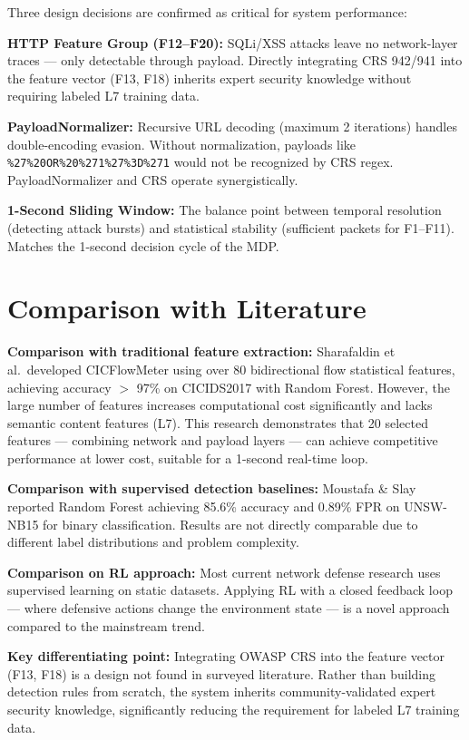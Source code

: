 \documentclass[12pt,a4paper]{report}
\begin{document}
Three design decisions are confirmed as critical for system performance:

\textbf{HTTP Feature Group (F12--F20):} SQLi/XSS attacks leave no network-layer traces --- only detectable through payload. Directly integrating CRS 942/941 into the feature vector (F13, F18) inherits expert security knowledge without requiring labeled L7 training data.

\textbf{PayloadNormalizer:} Recursive URL decoding (maximum 2 iterations) handles double-encoding evasion. Without normalization, payloads like \texttt{\%27\%20OR\%20\%271\%27\%3D\%271} would not be recognized by CRS regex. PayloadNormalizer and CRS operate synergistically.

\textbf{1-Second Sliding Window:} The balance point between temporal resolution (detecting attack bursts) and statistical stability (sufficient packets for F1--F11). Matches the 1-second decision cycle of the MDP.

\section{Comparison with Literature}

\textbf{Comparison with traditional feature extraction:} Sharafaldin et al.\ developed CICFlowMeter using over 80 bidirectional flow statistical features, achieving accuracy $>$ 97\% on CICIDS2017 with Random Forest. However, the large number of features increases computational cost significantly and lacks semantic content features (L7). This research demonstrates that 20 selected features --- combining network and payload layers --- can achieve competitive performance at lower cost, suitable for a 1-second real-time loop.

\textbf{Comparison with supervised detection baselines:} Moustafa \& Slay reported Random Forest achieving 85.6\% accuracy and 0.89\% FPR on UNSW-NB15 for binary classification. Results are not directly comparable due to different label distributions and problem complexity.

\textbf{Comparison on RL approach:} Most current network defense research uses supervised learning on static datasets. Applying RL with a closed feedback loop --- where defensive actions change the environment state --- is a novel approach compared to the mainstream trend.

\textbf{Key differentiating point:} Integrating OWASP CRS into the feature vector (F13, F18) is a design not found in surveyed literature. Rather than building detection rules from scratch, the system inherits community-validated expert security knowledge, significantly reducing the requirement for labeled L7 training data.
\end{document}
